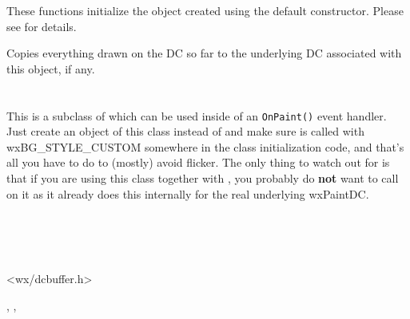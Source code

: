 
These functions initialize the object created using the default constructor.
Please see  for details.




\label{wxbuffereddcdtor}

Copies everything drawn on the DC so far to the underlying DC associated with
this object, if any.



\section{}\label{wxbufferedpaintdc}

This is a subclass of  which can be used
inside of an \texttt{OnPaint()} event handler. Just create an object of this class instead
of  and make sure 
is called with wxBG\_STYLE\_CUSTOM somewhere in the class initialization code, and that's all
you have to do to (mostly) avoid flicker. The only thing to watch out for is that if you are
using this class together with , you probably
do \textbf{not} want to call  on it as it
already does this internally for the real underlying wxPaintDC.


\\
\\
\\


<wx/dcbuffer.h>


,\rtfsp
{},\rtfsp
{}



